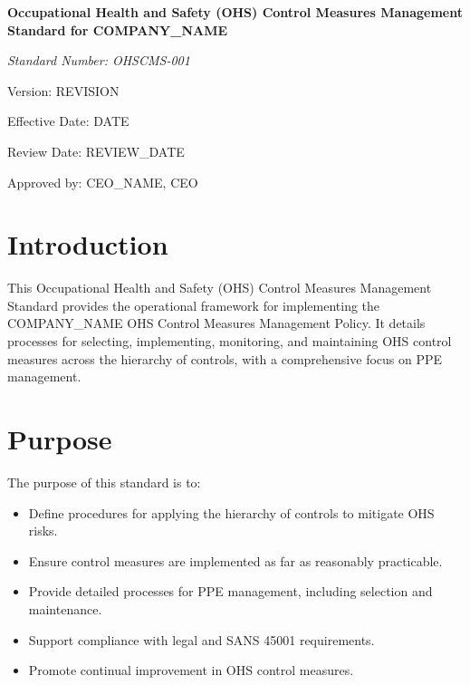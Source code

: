 \documentclass[12pt]{article}
\begin{document}
\begin{titlepage}
    \centering
    \vspace*{2cm}
    {\LARGE\bfseries Occupational Health and Safety (OHS) Control Measures Management Standard for {{COMPANY_NAME}}\par}
    \vspace{1cm}
    {\large\itshape Standard Number: OHSCMS-001\par}
    \vspace{0.5cm}
    {\normalsize Version: {{REVISION}}\par}
    \vspace{0.5cm}
    {\normalsize Effective Date: {{DATE}}\par}
    \vspace{0.5cm}
    {\normalsize Review Date: {{REVIEW_DATE}}\par}
    \vspace{2cm}
    {\normalsize Approved by: {{CEO_NAME}}, CEO\par}
\end{titlepage}

\section{Introduction}
This Occupational Health and Safety (OHS) Control Measures Management Standard provides the operational framework for implementing the {{COMPANY_NAME}} OHS Control Measures Management Policy. It details processes for selecting, implementing, monitoring, and maintaining OHS control measures across the hierarchy of controls, with a comprehensive focus on PPE management.

\section{Purpose}
The purpose of this standard is to:
\begin{itemize}
    \item Define procedures for applying the hierarchy of controls to mitigate OHS risks.
    \item Ensure control measures are implemented as far as reasonably practicable.
    \item Provide detailed processes for PPE management, including selection and maintenance.
    \item Support compliance with legal and SANS 45001 requirements.
    \item Promote continual improvement in OHS control measures.
\end{itemize}
\end{document}
